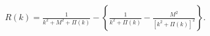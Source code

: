 \begin{equation}
R(k)=\tfrac{1}{k^{2}+M^{2}+\Pi(k)}-\left\{  \tfrac{1}{k^{2}+\Pi(k)}%
-\tfrac{M^{2}}{\left[  k^{2}+\Pi(k)\right]  ^{2}}\right\}.
\end{equation}

